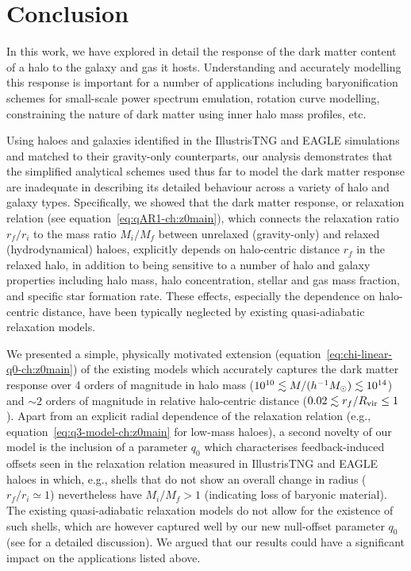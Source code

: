 \section{Conclusion}
\label{sec:conclusion-ch:z0main}
In this work, we have explored in detail the response of the dark matter content of a halo to the galaxy and gas it hosts. Understanding and accurately modelling this response is important for a number of applications including baryonification schemes for small-scale power spectrum emulation, rotation curve modelling, %
constraining the nature of dark matter using inner halo mass profiles, etc. 

Using haloes and galaxies identified in the IllustrisTNG and EAGLE simulations and matched to their gravity-only counterparts, our analysis demonstrates that the simplified analytical schemes used thus far to model the dark matter response \citep[e.g.,][]{1986ApJ...301...27B,2010MNRAS.407..435A,2015JCAP...12..049S} are inadequate in describing its detailed behaviour across a variety of halo and galaxy types. Specifically, we showed that the dark matter response, or relaxation relation (see equation~\ref{eq:qAR1-ch:z0main}), which connects the relaxation ratio $r_f/r_i$ to the mass ratio $M_i/M_f$ between unrelaxed (gravity-only) and relaxed (hydrodynamical) haloes, explicitly depends on halo-centric distance $r_f$ in the relaxed halo, in addition to being sensitive to a number of halo and galaxy properties including halo mass, halo concentration, stellar and gas mass fraction, and specific star formation rate. These effects, especially the dependence on halo-centric distance, have been typically neglected by existing quasi-adiabatic relaxation models. 

We presented a simple, physically motivated extension (equation~\ref{eq:chi-linear-q0-ch:z0main}) of the existing models which accurately captures the dark matter response over 4 orders of magnitude in halo mass ($10^{10}\lesssim M/(h^{-1}M_{\odot})\lesssim 10^{14}$) and $\sim2$ orders of magnitude in relative halo-centric distance ($0.02\lesssim r_f/R_{\rm vir}\leq1$). Apart from an explicit radial dependence of the relaxation relation (e.g., equation~\ref{eq:q3-model-ch:z0main} for low-mass haloes), a second novelty of our model is the inclusion of a parameter $q_0$ which characterises feedback-induced offsets seen in the relaxation relation measured in IllustrisTNG and EAGLE haloes in which, e.g., shells that do not show an overall change in radius ($r_f/r_i\simeq1$) nevertheless have $M_i/M_f>1$ (indicating loss of baryonic material). The existing quasi-adiabatic relaxation models do not allow for the existence of such shells, which are however captured well by our new null-offset parameter $q_0$ (see  for a detailed discussion).
We argued that our results could have a significant impact on the applications listed above.

